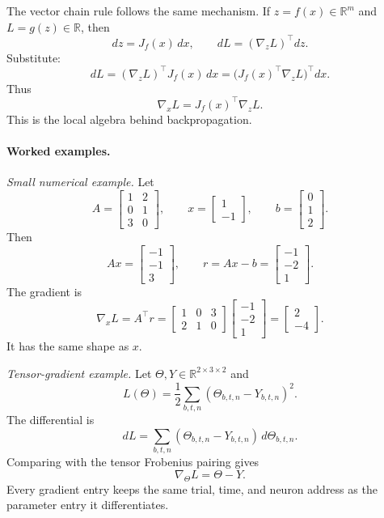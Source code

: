 The vector chain rule follows the same mechanism. If \(z=f(x)\in\mathbb{R}^m\) and \(L=g(z)\in\mathbb{R}\), then
\[
dz=J_f(x)\,dx,
\qquad
dL=(\nabla_z L)^\top dz.
\]
Substitute:
\[
dL=(\nabla_z L)^\top J_f(x)\,dx
=\big(J_f(x)^\top\nabla_z L\big)^\top dx.
\]
Thus
\[
\nabla_x L=J_f(x)^\top\nabla_z L.
\]
This is the local algebra behind backpropagation.

\paragraph{Worked examples.}
\emph{Small numerical example.} Let
\[
A=
\begin{bmatrix}
1&2\\
0&1\\
3&0
\end{bmatrix},
\qquad
x=
\begin{bmatrix}
1\\
-1
\end{bmatrix},
\qquad
b=
\begin{bmatrix}
0\\
1\\
2
\end{bmatrix}.
\]
Then
\[
Ax=
\begin{bmatrix}
-1\\
-1\\
3
\end{bmatrix},
\qquad
r=Ax-b=
\begin{bmatrix}
-1\\
-2\\
1
\end{bmatrix}.
\]
The gradient is
\[
\nabla_x L=A^\top r
=
\begin{bmatrix}
1&0&3\\
2&1&0
\end{bmatrix}
\begin{bmatrix}
-1\\
-2\\
1
\end{bmatrix}
=
\begin{bmatrix}
2\\
-4
\end{bmatrix}.
\]
It has the same shape as \(x\).

\emph{Tensor-gradient example.} Let \(\Theta,Y\in\mathbb{R}^{2\times 3\times 2}\) and
\[
L(\Theta)=\frac12\sum_{b,t,n}(\Theta_{b,t,n}-Y_{b,t,n})^2.
\]
The differential is
\[
dL=\sum_{b,t,n}(\Theta_{b,t,n}-Y_{b,t,n})\,d\Theta_{b,t,n}.
\]
Comparing with the tensor Frobenius pairing gives
\[
\nabla_\Theta L=\Theta-Y.
\]
Every gradient entry keeps the same trial, time, and neuron address as the parameter entry it differentiates.

